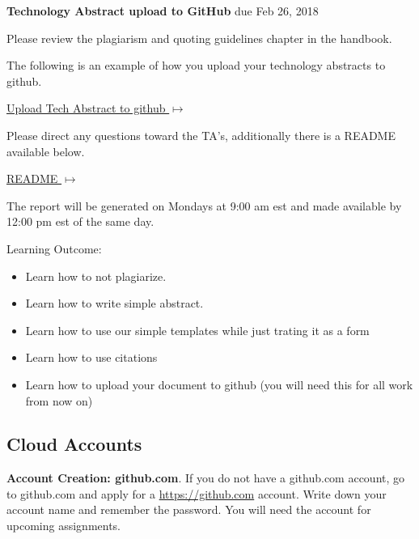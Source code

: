 \begin{exercise}{\bf Technology Abstract upload to GitHub} due Feb 26,
  2018


Please review the plagiarism and quoting guidelines chapter in the
handbook.


The following is an example of how you upload your technology
abstracts to github.
\smallskip

{\hfill \href{https://github.com/cloudmesh-community/hid-sample/tree/master/technology}{Upload
    Tech Abstract to github $\mapsto$}}

\smallskip

Please direct any questions toward the TA's, additionally there is a
README available below. 

{\hfill
  \href{https://github.com/cloudmesh-community/hid-sample/blob/master/technology/README.md}{README
    $\mapsto$}}

\smallskip

The report will be generated on Mondays at 9:00 am est and made
available by 12:00 pm est of the same day.
\smallskip


\end{exercise}

Learning Outcome:

\begin{itemize}
\item Learn how to not plagiarize.
\item Learn how to write simple abstract.
\item Learn how to use our simple templates while just trating it as a
  form
\item Learn how to use citations
\item Learn how to upload your document to github (you will need this
  for all work from now on)

\end{itemize}

\subsection{Cloud Accounts}
\label{a:accounts}
\begin{exercise}

  {\bf Account Creation: github.com}. If you do not have a github.com
  account, go to github.com and apply for a \url{https://github.com}
  account. Write down your account name and remember the password. You
  will need the account for upcoming assignments.

\end{exercise}

